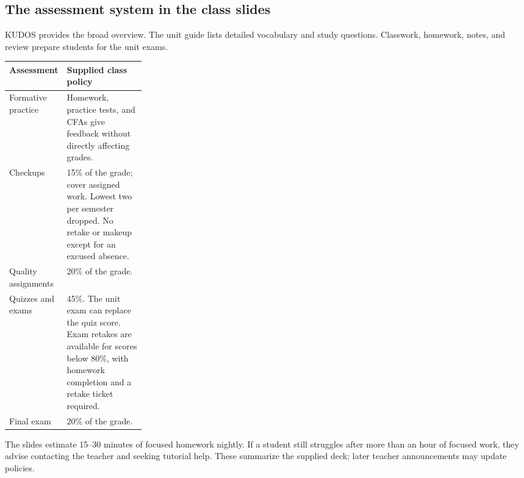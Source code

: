 \subsection*{The assessment system in the class slides}
KUDOS provides the broad overview. The unit guide lists detailed vocabulary and study questions. Classwork, homework, notes, and review prepare students for the unit exams.
\par
\begin{tabularx}{\linewidth}{@{}p{0.26\linewidth}Y@{}}\toprule
Assessment & Supplied class policy\\\midrule
Formative practice & Homework, practice tests, and CFAs give feedback without directly affecting grades.\\
Checkups & 15\% of the grade; cover assigned work. Lowest two per semester dropped. No retake or makeup except for an excused absence.\\
Quality assignments & 20\% of the grade.\\
Quizzes and exams & 45\%. The unit exam can replace the quiz score. Exam retakes are available for scores below 80\%, with homework completion and a retake ticket required.\\
Final exam & 20\% of the grade.\\\bottomrule
\end{tabularx}\par
The slides estimate 15--30 minutes of focused homework nightly. If a student still struggles after more than an hour of focused work, they advise contacting the teacher and seeking tutorial help. These summarize the supplied deck; later teacher announcements may update policies.
